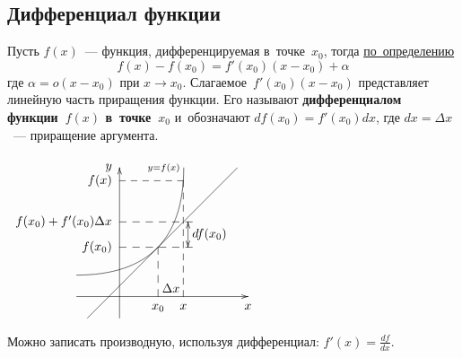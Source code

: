 \subsection{Дифференциал функции}
\hypertarget{def:differential_of_function}{} Пусть $f(x)$~--- функция, дифференцируемая в~точке~$x_0$, тогда \hyperlink{def:differentiability_of_function}{по~определению}
\begin{equation*}
f(x) - f(x_0) = f'(x_0)(x - x_0) + \alpha
\end{equation*}
\noindent где $\alpha = o(x - x_0)$ при $x \to x_0$.
Слагаемое~$f'(x_0)(x - x_0)$ представляет линейную часть приращения функции.
Его называют \textbf{дифференциалом функции~$f(x)$ в~точке~$x_0$} и~обозначают $df(x_0) = f'(x_0)dx$, где $dx = \Delta x$~--- приращение аргумента.

\begin{center}
\noindent
$\begin{xy} /r12mm/:
(-1, 0); (3, 0) **@{-} *@{>} *++!U{x};
(0, -0.5); (0, 3) **@{-} *@{>} *++!R{y};
(-1, 0.5); (1.5, 3) **\crv{(1.5, 0.5)} *+!R{\scriptstyle y = f(x)};
(-0.75, -0.5); (2.75, 3) **@{-}; %
(0.9, 1.15) = "M"; (0.9, 0) **@{--} *++!U{x_0};
(1.7, 1.15); (0, 1.15) **@{--} *++!R{f(x_0)};
(1.49, 2.7) = "X"; (1.49, 0) **@{--} *++!U{x};
"X"; (0, 2.7) **@{--} *++!R{f(x)};
(1.2, 0.2) *{\Delta x};
(1.7, 1.74); (0, 1.74) **@{--} *++!R{f(x_0) + f'(x_0) \Delta x};
(1.6, 1.74); (1.6, 1.15) **{} *@{>}; %
(1.6, 1.74) **@{-} *@{>};
(2.1, 1.45) *{df(x_0)};
\end{xy}$
\end{center}

Можно записать производную, используя дифференциал: $\displaystyle f'(x) = \frac{df}{dx}$.